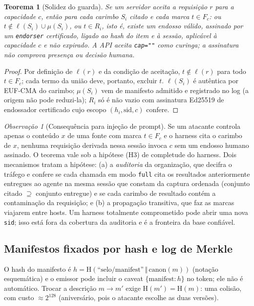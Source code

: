 \documentclass[11pt,a4paper]{article}
\theoremstyle{plain}
\newtheorem{teorema}{Teorema}
\theoremstyle{definition}
\theoremstyle{remark}
\newtheorem*{observacao}{Observação}
\newcommand{\Hash}{\mathrm{H}}
\newcommand{\cat}{\,\Vert\,}
\newcommand{\cod}[1]{\texttt{#1}}
\begin{document}
\begin{teorema}[Solidez do guarda]
Se um servidor aceita a requisição $r$ para a capacidade $c$, então para cada carimbo $S_i$ citado e cada marca $t\in F_c$: ou $t\notin\ell(S_i)\cup\mu(S_i)$, ou $t\in R_i$, isto é, existe um endosso válido, assinado por um \cod{endorser} certificado, ligado ao hash do item e à sessão, aplicável à capacidade $c$ e não expirado. A API aceita \cod{cap=""} como curinga; a assinatura não comprova presença ou decisão humana.
\end{teorema}
\begin{proof}
Por definição de $\ell(r)$ e da condição de aceitação, $t\notin\ell(r)$ para todo $t\in F_c$; cada termo da união deve, portanto, excluir $t$. $\ell(S_i)$ é autêntica por EUF-CMA do carimbo; $\mu(S_i)$ vem de manifesto admitido e registrado no log (a origem não pode reduzi-la); $R_i$ só é não vazio com assinatura Ed25519 de endossador certificado cujo escopo $(h_i,\text{sid},c)$ confere. \qedhere
\end{proof}

\begin{observacao}[Consequência para injeção de prompt]
Se um atacante controla apenas o conteúdo $x$ de uma fonte com marca $t\in F_c$ e o harness cita o carimbo de $x$, nenhuma requisição derivada nessa sessão invoca $c$ sem um endosso humano assinado. O teorema vale sob a hipótese (H3) de completude do harness. Dois mecanismos tratam a hipótese: (a) a \emph{auditoria} da organização, que decifra o tráfego e confere se cada chamada em modo \cod{full} cita os resultados anteriormente entregues ao agente na mesma sessão que constam da captura ordenada (conjunto citado $\supseteq$ conjunto entregue) e se cada carimbo de resultado contém a contaminação da requisição; e (b) a propagação transitiva, que faz as marcas viajarem entre hosts. Um harness totalmente comprometido pode abrir uma nova \cod{sid}; isso está fora da cobertura da auditoria e é a fronteira da base confiável.
\end{observacao}

\subsection{Manifestos fixados por hash e log de Merkle}

O hash do manifesto é $h=\Hash(\text{``selo/manifest''}\cat\mathrm{canon}(m))$ (notação esquemática) e o emissor pode incluir o caveat $\{\text{manifest}:h\}$ no token; ele não é automático. Trocar a descrição $m\to m'$ exige $\Hash(m')=\Hash(m)$: uma colisão, com custo $\approx 2^{128}$ (aniversário, pois o atacante escolhe as duas versões).
\end{document}
